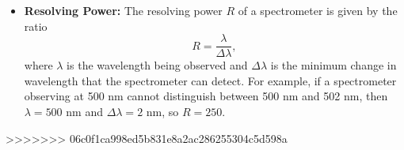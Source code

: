\documentclass[%
 reprint,
superscriptaddress,
 amsmath,amssymb,
 aps,
prc,
]{revtex4-1}
\begin{document}
\begin{itemize}
	\item \textbf{Resolving Power:} The resolving power $R$ of a spectrometer is given by the ratio
	\begin{equation}
		R = \frac{\lambda}{\Delta\lambda},
	\end{equation}
	where $\lambda$ is the wavelength being observed and $\Delta\lambda$ is the minimum change in wavelength that the spectrometer can detect. For example, if a spectrometer observing at 500 nm cannot distinguish between 500 nm and 502 nm, then $\lambda = 500$ nm and $\Delta\lambda = 2$ nm, so $R = 250$.
\end{itemize}

>>>>>>> 06c0f1ca998ed5b831e8a2ac286255304c5d598a
\end{document}
